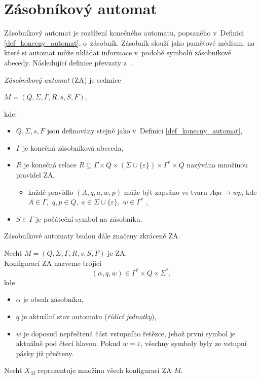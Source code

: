 \section{Zásobníkový automat}\label{kap_zasobnikovy_automat}
Zásobníkový automat je rozšíření konečného automatu, popsaného v~Definici \ref{def_konecny_automat}, o~zásobník.
Zásobník slouží jako paměťové médium, na které si automat může ukládat informace v~podobě symbolů zásobníkové abecedy.
Následující definice převzaty z~\cite{meduna2023automata, TIN-opora}.
\begin{definition}\label{def_zasobnikovy_automat}
    \emph{Zásobníkový automat} (ZA) je sedmice 
    \begin{center}
        $M = (Q, \Sigma, \Gamma, R, s, S, F)$,
    \end{center}
    kde:
    \begin{itemize}
        \item $Q, \Sigma, s, F$ jsou definovány stejně jako v~Definici \ref{def_konecny_automat},
        \item $\Gamma$ je konečná zásobníková abeceda,
        \item $R$ je konečná relace $R \subseteq \Gamma \times Q \times (\Sigma \cup \{\varepsilon\}) \times \Gamma^* \times Q$ nazývána množinou pravidel ZA,
        \begin{itemize}[label=$\circ$]
            \item každé pravidlo $(A, q, a, w, p)$ může být zapsáno ve tvaru $Aqa \rightarrow wp$, kde $A \in \Gamma,$ $q, p \in Q,\; a \in \Sigma \cup \{\varepsilon\},\; w \in \Gamma^*$ \cite{meduna2017modely},
        \end{itemize}  
        \item $S \in \Gamma$ je počáteční symbol na zásobníku.
    \end{itemize}
\end{definition}

\begin{convention}
    Zásobníkové automaty budou dále značeny zkráceně ZA.
\end{convention}

\begin{definition}\label{def_konfigurace_za}
    Nechť $M = (Q, \Sigma, \Gamma, R, s, S, F)$ je ZA.\\
    Konfigurací ZA nazveme trojici
    \begin{equation*}
        (\alpha, q, w) \in \Gamma^* \times Q \times \Sigma^*, 
    \end{equation*}
    kde
    \begin{itemize}
        \item $\alpha$ je obsah zásobníku,
        \item $q$ je aktuální stav automatu (\emph{řídící jednotky}),
        \item $w$ je doposud nepřečtená část vstupního řetězce, jehož první symbol je aktuálně pod čtecí hlavou.
        Pokud $w = \varepsilon$, všechny symboly byly ze vstupní pásky již přečteny.
    \end{itemize}
    Nechť $X_M$ reprezentuje množinu všech konfigurací ZA $M$.
\end{definition}

